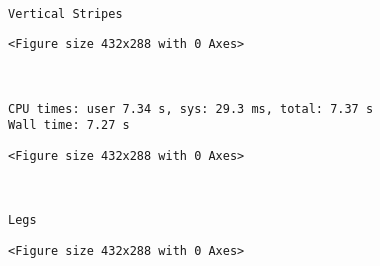 \documentclass[11pt]{article}
\begin{document}
    
    \begin{center}
    \end{center}
    { \hspace*{\fill} \\}
    
    \begin{Verbatim}[commandchars=\\\{\}]
Vertical Stripes

    \end{Verbatim}

    
    \begin{verbatim}
<Figure size 432x288 with 0 Axes>
    \end{verbatim}

    
    \begin{center}
    \end{center}
    { \hspace*{\fill} \\}
    
    \begin{Verbatim}[commandchars=\\\{\}]
CPU times: user 7.34 s, sys: 29.3 ms, total: 7.37 s
Wall time: 7.27 s

    \end{Verbatim}

    
    \begin{verbatim}
<Figure size 432x288 with 0 Axes>
    \end{verbatim}

    
    \begin{center}
    \end{center}
    { \hspace*{\fill} \\}
    
    \begin{Verbatim}[commandchars=\\\{\}]
Legs

    \end{Verbatim}

    
    \begin{verbatim}
<Figure size 432x288 with 0 Axes>
    \end{verbatim}

    
    \begin{center}
    \end{center}
    { \hspace*{\fill} \\}
    
\end{document}
